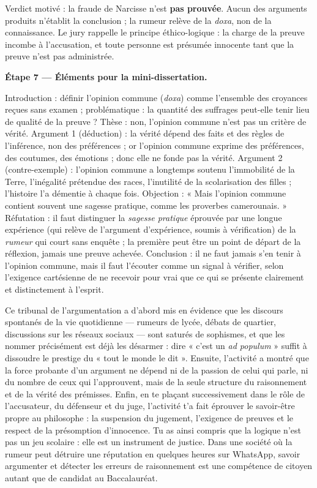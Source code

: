 \documentclass[11pt]{article}
\newcounter{popsec}
\newcounter{popsub}
\newcommand{\courssub}[1]{%
  \stepcounter{popsub}%
  \par\vspace{9pt}\noindent{\popxbold\fontsize{11.5}{13}\selectfont\color{popink}{\color{poporange}\thepopsec.\thepopsub}\hspace{6pt}#1}\par\nopagebreak\vspace{4pt}
}
\begin{document}
\begin{exoresolu}
Verdict motivé : la fraude de Narcisse n'est \textbf{pas prouvée}. Aucun des arguments produits n'établit la conclusion ; la rumeur relève de la \emph{doxa}, non de la connaissance. Le jury rappelle le principe éthico-logique : la charge de la preuve incombe à l'accusation, et toute personne est présumée innocente tant que la preuve n'est pas administrée.

\textbf{Étape 7 — Éléments pour la mini-dissertation.}

Introduction : définir l'opinion commune (\emph{doxa}) comme l'ensemble des croyances reçues sans examen ; problématique : la quantité des suffrages peut-elle tenir lieu de qualité de la preuve ? Thèse : non, l'opinion commune n'est pas un critère de vérité. Argument 1 (déduction) : la vérité dépend des faits et des règles de l'inférence, non des préférences ; or l'opinion commune exprime des préférences, des coutumes, des émotions ; donc elle ne fonde pas la vérité. Argument 2 (contre-exemple) : l'opinion commune a longtemps soutenu l'immobilité de la Terre, l'inégalité prétendue des races, l'inutilité de la scolarisation des filles ; l'histoire l'a démentie à chaque fois. Objection : « Mais l'opinion commune contient souvent une sagesse pratique, comme les proverbes camerounais. » Réfutation : il faut distinguer la \emph{sagesse pratique} éprouvée par une longue expérience (qui relève de l'argument d'expérience, soumis à vérification) de la \emph{rumeur} qui court sans enquête ; la première peut être un point de départ de la réflexion, jamais une preuve achevée. Conclusion : il ne faut jamais s'en tenir à l'opinion commune, mais il faut l'écouter comme un signal à vérifier, selon l'exigence cartésienne de ne recevoir pour vrai que ce qui se présente clairement et distinctement à l'esprit.
\end{exoresolu}

\courssub{Bilan de l'activité}

Ce tribunal de l'argumentation a d'abord mis en évidence que les discours spontanés de la vie quotidienne — rumeurs de lycée, débats de quartier, discussions sur les réseaux sociaux — sont saturés de sophismes, et que les nommer précisément est déjà les désarmer : dire « c'est un \emph{ad populum} » suffit à dissoudre le prestige du « tout le monde le dit ». Ensuite, l'activité a montré que la force probante d'un argument ne dépend ni de la passion de celui qui parle, ni du nombre de ceux qui l'approuvent, mais de la seule structure du raisonnement et de la vérité des prémisses. Enfin, en te plaçant successivement dans le rôle de l'accusateur, du défenseur et du juge, l'activité t'a fait éprouver le savoir-être propre au philosophe : la suspension du jugement, l'exigence de preuves et le respect de la présomption d'innocence. Tu as ainsi compris que la logique n'est pas un jeu scolaire : elle est un instrument de justice. Dans une société où la rumeur peut détruire une réputation en quelques heures sur WhatsApp, savoir argumenter et détecter les erreurs de raisonnement est une compétence de citoyen autant que de candidat au Baccalauréat.
\end{document}
